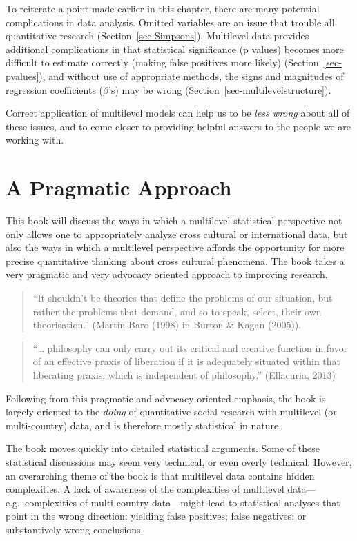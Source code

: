 \documentclass[
  letterpaper,
  DIV=11,
  numbers=noendperiod]{scrreprt}
\begin{document}
To reiterate a point made earlier in this chapter, there are many
potential complications in data analysis. Omitted variables are an issue
that trouble all quantitative research (Section~\ref{sec-Simpsons}).
Multilevel data provides additional complications in that statistical
significance (p values) becomes more difficult to estimate correctly
(making false positives more likely) (Section~\ref{sec-pvalues}), and
without use of appropriate methods, the signs and magnitudes of
regression coefficients (\(\beta\)'s) may be wrong
(Section~\ref{sec-multilevelstructure}).

Correct application of multilevel models can help us to be \emph{less
wrong} about all of these issues, and to come closer to providing
helpful answers to the people we are working with.

\section{A Pragmatic Approach}\label{a-pragmatic-approach}

This book will discuss the ways in which a multilevel statistical
perspective not only allows one to appropriately analyze cross cultural
or international data, but also the ways in which a multilevel
perspective affords the opportunity for more precise quantitative
thinking about cross cultural phenomena. The book takes a very pragmatic
and very advocacy oriented approach to improving research.
 

\begin{quote}
``It shouldn't be theories that define the problems of our situation,
but rather the problems that demand, and so to speak, select, their own
theorisation.'' (Martin-Baro (1998) in Burton \& Kagan (2005)).
\end{quote}

\begin{quote}
``\ldots{} philosophy can only carry out its critical and creative
function in favor of an effective praxis of liberation if it is
adequately situated within that liberating praxis, which is independent
of philosophy.'' (Ellacuria, 2013)
\end{quote}

Following from this pragmatic and advocacy oriented emphasis, the book
is largely oriented to the \emph{doing} of quantitative social research
with multilevel (or multi-country) data, and is therefore mostly
statistical in nature.

The book moves quickly into detailed statistical arguments. Some of
these statistical discussions may seem very technical, or even overly
technical. However, an overarching theme of the book is that multilevel
data contains hidden complexities. A lack of awareness of the
complexities of multilevel data---e.g.~complexities of multi-country
data---might lead to statistical analyses that point in the wrong
direction: yielding false positives; false negatives; or substantively
wrong conclusions.
\end{document}
